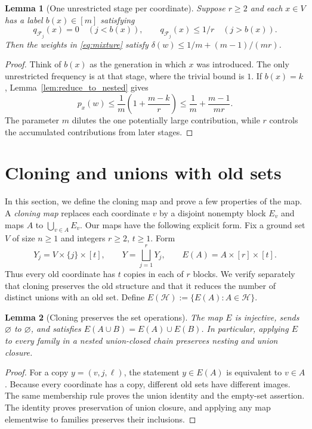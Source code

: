 \documentclass[11pt]{article}
\newtheorem{lemma}[lemma]{Lemma}
\newcommand{\<}{\langle}
\renewcommand{\>}{\rangle}
\newcommand{\F}{\mathcal{F}}
\numberwithin{equation}{section}
\begin{document}
\begin{lemma}[One unrestricted stage per coordinate]\label{lem:generation-average}
Suppose $r\ge2$ and each $x\in V$ has a label $b(x)\in[m]$ satisfying
\begin{equation}\label{eq:generation-pattern}
 q_{\F_j}(x)=0\quad(j<b(x)),\qquad
 q_{\F_j}(x)\le1/r\quad(j>b(x)).
\end{equation}
Then the weights in \eqref{eq:mixture} satisfy
$\delta(w)\le1/m+(m-1)/(mr)$.
\end{lemma}
\begin{proof}
Think of $b(x)$ as the generation in which $x$ was introduced. The only
unrestricted frequency is at that stage, where the trivial bound is $1$.
 If $b(x)=k$,
Lemma~\ref{lem:reduce_to_nested} gives
\[
 p_x(w)\le\frac1m\left(1+\frac{m-k}{r}\right)
          \le\frac1m+\frac{m-1}{mr}.
\]
The parameter $m$ dilutes the one potentially large contribution, while $r$
controls the accumulated contributions from later stages.
\end{proof}

\section{Cloning and unions with old sets}\label{sec:cloning}
In this section, we define the cloning map and prove a few properties of the map. A \emph{cloning map} replaces each coordinate $v$ by a disjoint nonempty
block $E_v$ and maps $A$ to $\bigcup_{v\in A}E_v$. Our maps have the following
explicit form. Fix a ground set $V$ of size $n\ge1$ and integers $r\ge2$,
$t\ge1$. Form
\begin{equation}\label{eq:clone}
 Y_j=V\times\{j\}\times[t],\qquad
 Y=\bigsqcup_{j=1}^rY_j,\qquad E(A)=A\times[r]\times[t].
\end{equation}
Thus every old coordinate has $t$ copies in each of $r$ blocks. We verify
separately that cloning preserves the old structure and that it reduces
the number of distinct unions with an old set. Define \(E(\mathcal H):=\{E(A):A\in\mathcal H\}\).

\begin{lemma}[Cloning preserves the set operations]\label{lem:clone-structure}
The map $E$ is injective, sends $\varnothing$ to $\varnothing$, and satisfies
$E(A\cup B)=E(A)\cup E(B)$. In particular, applying $E$ to every family in a
nested union-closed chain preserves nesting and union closure.
\end{lemma}
\begin{proof}
For a copy $y=(v,j,\ell)$, the statement $y\in E(A)$ is equivalent to $v\in A$.
Because every coordinate has a copy, different old sets have different
images. The same membership rule proves the union identity and the
empty-set assertion. The identity proves preservation of union closure,
and applying any map elementwise to families preserves their inclusions.
\end{proof}
\end{document}

